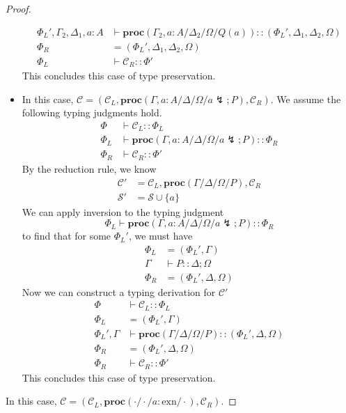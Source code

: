 \documentclass[12pt, openany]{memoir}
\newcommand*{\cancel}[1]{#1 \lightning}
\newcommand*{\procObj}[4]{\textbf{proc}(#1/#2/#3/#4)}
\newcommand*{\config}[0]{\mathcal{C}}
\newcommand*{\cancelSet}[0]{\mathcal{S}}
\begin{document}
\begin{proof}
\begin{itemize}
\begin{align*}
      \Phi_L', \Gamma_2, \Delta_1, a : A & \vdash \procObj{\Gamma_2, a : A}{\Delta_2}{\Omega}{Q(a)} :: (\Phi_L', \Delta_1, \Delta_2, \Omega) \\
      \Phi_R &= (\Phi_L', \Delta_1, \Delta_2, \Omega) \\
      \Phi_L & \vdash \config_R :: \Phi'
    \end{align*}
    This concludes this case of type preservation.
  \item [\stepref{cancelL}{cancel-l}] In this case, $\config = (\config_L, \procObj{\Gamma, a : A}{\Delta}{\Omega}{\cancel{a}; P}, \config_R)$.
    We assume the following typing judgments hold.
    \begin{align*}
      \Phi & \vdash \config_L :: \Phi_L \\
      \Phi_L & \vdash \procObj{\Gamma, a : A}{\Delta}{\Omega}{\cancel{a}; P} :: \Phi_R \\
      \Phi_R & \vdash \config_R :: \Phi'
    \end{align*}
    By the reduction rule, we know
    \begin{align*}
      \config' &= \config_L, \procObj{\Gamma}{\Delta}{\Omega}{P}, \config_R \\
      \cancelSet' &= \cancelSet \cup \{a\}
    \end{align*}
    We can apply inversion to the typing judgment
    \[
      \Phi_L \vdash \procObj{\Gamma, a : A}{\Delta}{\Omega}{\cancel{a}; P} :: \Phi_R
    \]
    to find that for some $\Phi_L'$, we must have
    \begin{align*}
      \Phi_L & = (\Phi_L', \Gamma) \\
      \Gamma & \vdash P :: \Delta; \Omega \\
      \Phi_R & = (\Phi_L', \Delta, \Omega)
    \end{align*}
    Now we can construct a typing derivation for $\config'$
    \begin{align*}
      \Phi & \vdash \config_L :: \Phi_L \\
      \Phi_L & = (\Phi_L', \Gamma) \\
      \Phi_L', \Gamma & \vdash \procObj{\Gamma}{\Delta}{\Omega}{P} :: (\Phi_L', \Delta, \Omega) \\
      \Phi_R & = (\Phi_L', \Delta, \Omega) \\
      \Phi_R & \vdash \config_R :: \Phi'
    \end{align*}
    This concludes this case of type preservation.
  \end{itemize}
\item [\stepref{silence}{silent}] In this case, $\config = (\config_L, \procObj{\cdot}{\cdot}{a : \text{exn}}{\cdot}, \config_R)$.

\end{proof}
\end{document}
